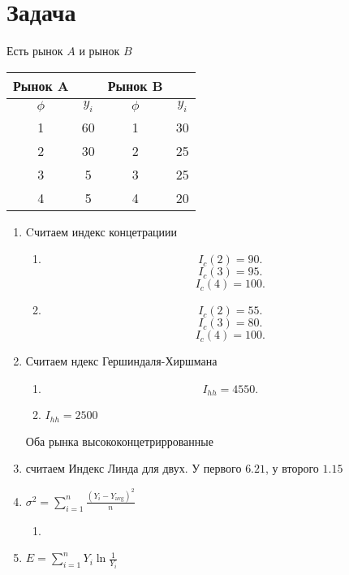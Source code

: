 \documentclass[14pt]{extarticle}
\begin{document}
\section{Задача}
Есть рынок $A$ и рынок  $B$
\begin{tabular}{|c|c|c|c|}
    \hline
    Рынок A & & Рынок B & \\
    \hline
    $\phi$ &  $y_{i}$ & $\phi$ &  $y_{i}$ \\
    \hline
    1 & 60 & 1 & 30\\
    \hline
    2 & 30 & 2 & 25\\
    \hline
    3 & 5 & 3 & 25\\
    \hline
    4 & 5 &4 & 20 \\
    \hline
\end{tabular}
\begin{enumerate}
    \item  Cчитаем индекс концетрациии
        \begin{enumerate}
            \item
            \[
            I_{c} (2) =90
            .\] 
            \[
            I_{c} (3) = 95
            .\] 
            \[
            I_{c} (4) = 100
            .\] 
            \item
                \[
                I_{c}(2) = 55
                .\] 
                \[
                I_{c}(3) = 80
                .\] 
                \[
                I_{c}(4) = 100
                .\] 
        \end{enumerate}
    \item Считаем ндекс Гершиндаля-Хиршмана
        \begin{enumerate}
            \item 
                \[
                I_{hh}  = 4550
                .\] 
            \item $I_{hh} = 2500$
        \end{enumerate}
        Оба рынка высококонцетриррованные
    \item считаем Индекс Линда для двух. У первого $6.21$, у второго  $1.15$
    \item $\sigma^2 = \sum_{i = 1}^{n} \frac{ ( Y_{i} -  Y_{\text{avg}} )^2 }{n} $
    \begin{enumerate}
        \item 
    \end{enumerate}
\item $E = \sum_{i = 1}^{n} Y_{i} \ln{\frac{1}{Y_{i}}}$
\end{enumerate}
\end{document}
